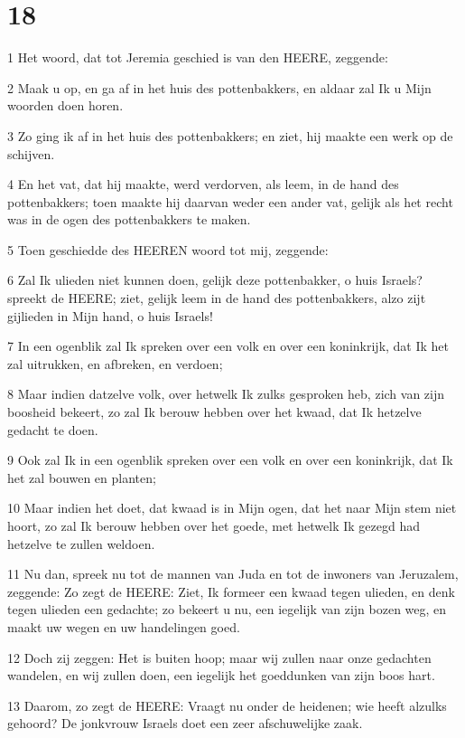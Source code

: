 \chapter{18}

\par 1 Het woord, dat tot Jeremia geschied is van den HEERE, zeggende:
\par 2 Maak u op, en ga af in het huis des pottenbakkers, en aldaar zal Ik u Mijn woorden doen horen.
\par 3 Zo ging ik af in het huis des pottenbakkers; en ziet, hij maakte een werk op de schijven.
\par 4 En het vat, dat hij maakte, werd verdorven, als leem, in de hand des pottenbakkers; toen maakte hij daarvan weder een ander vat, gelijk als het recht was in de ogen des pottenbakkers te maken.
\par 5 Toen geschiedde des HEEREN woord tot mij, zeggende:
\par 6 Zal Ik ulieden niet kunnen doen, gelijk deze pottenbakker, o huis Israels? spreekt de HEERE; ziet, gelijk leem in de hand des pottenbakkers, alzo zijt gijlieden in Mijn hand, o huis Israels!
\par 7 In een ogenblik zal Ik spreken over een volk en over een koninkrijk, dat Ik het zal uitrukken, en afbreken, en verdoen;
\par 8 Maar indien datzelve volk, over hetwelk Ik zulks gesproken heb, zich van zijn boosheid bekeert, zo zal Ik berouw hebben over het kwaad, dat Ik hetzelve gedacht te doen.
\par 9 Ook zal Ik in een ogenblik spreken over een volk en over een koninkrijk, dat Ik het zal bouwen en planten;
\par 10 Maar indien het doet, dat kwaad is in Mijn ogen, dat het naar Mijn stem niet hoort, zo zal Ik berouw hebben over het goede, met hetwelk Ik gezegd had hetzelve te zullen weldoen.
\par 11 Nu dan, spreek nu tot de mannen van Juda en tot de inwoners van Jeruzalem, zeggende: Zo zegt de HEERE: Ziet, Ik formeer een kwaad tegen ulieden, en denk tegen ulieden een gedachte; zo bekeert u nu, een iegelijk van zijn bozen weg, en maakt uw wegen en uw handelingen goed.
\par 12 Doch zij zeggen: Het is buiten hoop; maar wij zullen naar onze gedachten wandelen, en wij zullen doen, een iegelijk het goeddunken van zijn boos hart.
\par 13 Daarom, zo zegt de HEERE: Vraagt nu onder de heidenen; wie heeft alzulks gehoord? De jonkvrouw Israels doet een zeer afschuwelijke zaak.
